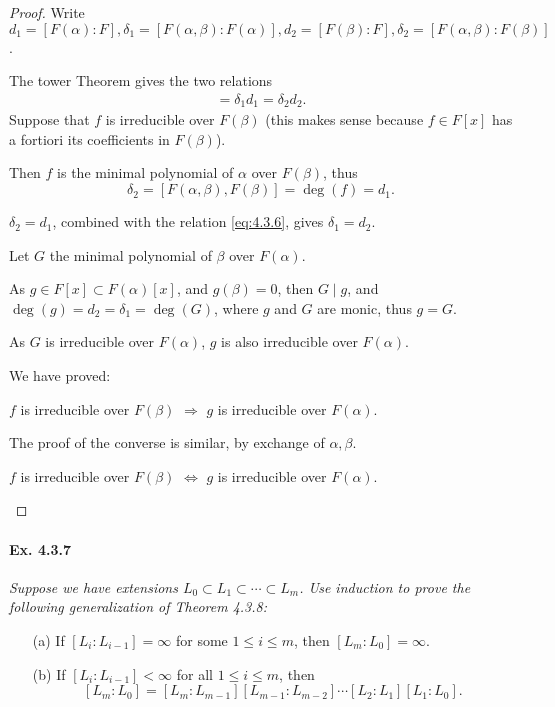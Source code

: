 \documentclass[11pt,a4paper]{article}
\begin{document}
\begin{proof}
Write $d_1 =[F(\alpha) : F], \delta_1= [F(\alpha,\beta):F(\alpha)], d_2 = [F(\beta):F],\delta_2 = [F(\alpha,\beta):F(\beta)]$.

The tower Theorem  gives the two relations
\begin{align}
[F(\alpha,\beta) :F] = \delta_1 d_1 = \delta_2 d_2. \label{eq:4.3.6}
\end{align}
Suppose that $f$ is irreducible over $F(\beta)$ (this makes sense because $f \in F[x]$ has a fortiori its coefficients in $F(\beta)$).

Then $f$ is the minimal polynomial of  $\alpha$ over $F(\beta)$, thus $$ \delta_2  = [F(\alpha,\beta),F(\beta)] = \deg(f) =d_1.$$

$\delta_2 = d_1$, combined with the relation \eqref{eq:4.3.6}, gives $\delta_1= d_2$.

Let $G$ the minimal polynomial of  $\beta$ over $F(\alpha)$.

As $g \in F[x] \subset F(\alpha)[x]$, and $g(\beta)=0$, then $G \mid g$, and $\deg(g) = d_2 = \delta_1 = \deg(G)$, where $g$ and  $G$ are monic, thus $g=G$.

As $G$ is irreducible over $F(\alpha)$, $g$ is also irreducible over $F(\alpha)$.

We have proved:
\begin{center}
$f$ is irreducible over $F(\beta)$ $\Rightarrow$ $g$ is irreducible over $F(\alpha)$.
\end{center}
The proof of the converse is similar, by exchange of $\alpha,\beta$.

\begin{center}
$f$ is irreducible over $F(\beta)$ $\iff$ $g$ is irreducible over $F(\alpha)$.
\end{center}
\end{proof}

\paragraph{Ex. 4.3.7}

{\it Suppose we have extensions $L_0 \subset L_1 \subset \cdots \subset L_m$. Use induction to prove the following generalization of Theorem 4.3.8:
\begin{enumerate}
\item[(a)] If $[L_i:L_{i-1}] = \infty$ for some $1\leq i \leq m$, then $[L_m:L_0] = \infty$.
\item[(b)] If $[L_i:L_{i-1}] < \infty$ for all $1\leq i \leq m$, then
$$[L_m:L_0] = [L_m:L_{m-1}][L_{m-1}:L_{m-2}]\cdots[L_2:L_1][L_1:L_0].$$
\end{enumerate}
}
\end{document}
